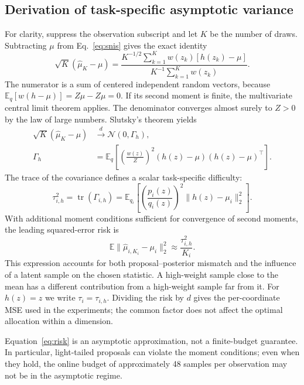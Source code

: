 \documentclass[10pt,letterpaper]{article}
\newcommand{\E}{\mathbb E}
\newcommand{\N}{\mathcal N}
\newcommand{\norm}[1]{\lVert #1\rVert_2}
\begin{document}
\subsection{Derivation of task-specific asymptotic variance}
For clarity, suppress the observation subscript and let $K$ be the number of draws. Subtracting $\mu$ from Eq.~\eqref{eq:snis} gives the exact identity
\begin{equation}
 \sqrt K(\widehat\mu_K-\mu)=\frac{K^{-1/2}\sum_{k=1}^{K}w(z_k)[h(z_k)-\mu]}{K^{-1}\sum_{k=1}^{K}w(z_k)}.
\end{equation}
The numerator is a sum of centered independent random vectors, because $\E_q[w(h-\mu)]=Z\mu-Z\mu=0$. If its second moment is finite, the multivariate central limit theorem applies. The denominator converges almost surely to $Z>0$ by the law of large numbers. Slutsky's theorem yields
\begin{align}
 \sqrt K(\widehat\mu_K-\mu)&\xrightarrow{d}\N(0,\Gamma_h),\\
 \Gamma_h&=\E_q\!\left[\left(\frac{w(z)}{Z}\right)^2(h(z)-\mu)(h(z)-\mu)^\top\right].
\end{align}
The trace of the covariance defines a scalar task-specific difficulty:
\begin{equation}
 {\tau_{i,h}^{2}=\operatorname{tr}(\Gamma_{i,h})=\E_{q_i}\!\left[\left(\frac{p_i(z)}{q_i(z)}\right)^2\norm{h(z)-\mu_i}^2\right].}
 \label{eq:tau}
\end{equation}
With additional moment conditions sufficient for convergence of second moments, the leading squared-error risk is
\begin{equation}
 \E\norm{\widehat\mu_{i,K_i}-\mu_i}^2\approx\frac{\tau_{i,h}^{2}}{K_i}.
 \label{eq:risk}
\end{equation}
This expression accounts for both proposal--posterior mismatch and the influence of a latent sample on the chosen statistic. A high-weight sample close to the mean has a different contribution from a high-weight sample far from it. For $h(z)=z$ we write $\tau_i=\tau_{i,h}$. Dividing the risk by $d$ gives the per-coordinate MSE used in the experiments; the common factor does not affect the optimal allocation within a dimension.

Equation~\eqref{eq:risk} is an asymptotic approximation, not a finite-budget guarantee. In particular, light-tailed proposals can violate the moment conditions; even when they hold, the online budget of approximately 48 samples per observation may not be in the asymptotic regime.
\end{document}
